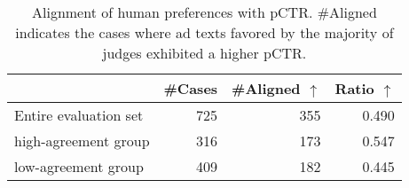 \begin{table}[t]
\centering
{\small
\begin{tabular}{@{ }l@{ }rrr@{ }}
\toprule
& \textbf{\#Cases} & \textbf{\#Aligned $\uparrow$} & \textbf{Ratio $\uparrow$} \\ \midrule
Entire evaluation set & 725 & 355 & 0.490 \\
\hspace{1em} high-agreement group & 316 & 173 & 0.547 \\
\hspace{1em} low-agreement group & 409 & 182 & 0.445 \\ \bottomrule
\end{tabular}}
\caption{Alignment of human preferences with pCTR. \#Aligned indicates the cases where ad texts favored by the majority of judges exhibited a higher pCTR.}\label{tab:alignment_preferece_pctr}
\end{table}
